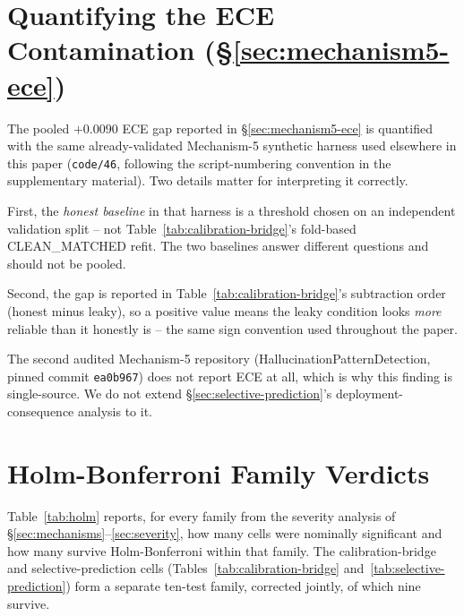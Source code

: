 \documentclass{article}
\begin{document}
\section{Quantifying the ECE Contamination (\S\ref{sec:mechanism5-ece})}
\label{app:ece}

The pooled $+0.0090$ ECE gap reported in \S\ref{sec:mechanism5-ece} is
quantified with the same already-validated Mechanism-5 synthetic harness used
elsewhere in this paper (\texttt{code/46}, following the script-numbering
convention in the supplementary material). Two details matter for
interpreting it correctly.

First, the \emph{honest baseline} in that harness is a threshold chosen on an
independent validation split -- not Table~\ref{tab:calibration-bridge}'s
fold-based CLEAN\_MATCHED refit. The two baselines answer different questions
and should not be pooled.

Second, the gap is reported in Table~\ref{tab:calibration-bridge}'s subtraction
order (honest minus leaky), so a positive value means the leaky condition looks
\emph{more} reliable than it honestly is -- the same sign convention used
throughout the paper.

The second audited Mechanism-5 repository (HallucinationPatternDetection,
pinned commit \texttt{ea0b967}) does not report ECE at all, which is why this
finding is single-source. We do not extend
\S\ref{sec:selective-prediction}'s deployment-consequence analysis to it.

\section{Holm-Bonferroni Family Verdicts}
\label{app:holm}

Table~\ref{tab:holm} reports, for every family from the severity analysis of
\S\ref{sec:mechanisms}--\ref{sec:severity}, how many cells were nominally
significant and how many survive Holm-Bonferroni within that family. The
calibration-bridge and selective-prediction cells
(Tables~\ref{tab:calibration-bridge} and~\ref{tab:selective-prediction}) form
a separate ten-test family, corrected jointly, of which nine survive.
\end{document}
